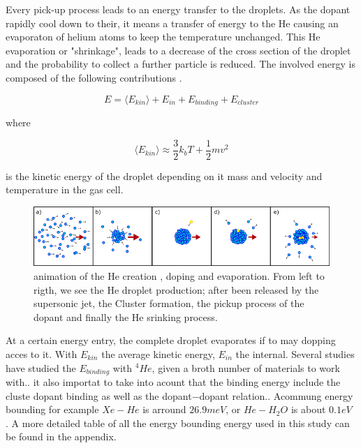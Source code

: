 Every pick-up process leads to an energy transfer to the droplets. As the dopant rapidly cool down to their, it means a transfer of energy to the He causing an  evaporaton of  helium atoms to keep the temperature unchanged. This He evaporation or "shrinkage", leads to a decrease of the cross section of the droplet and the probability to collect a further particle is  reduced. The involved energy is composed of the following contributions \cite{bunermann_modeling_2011}.

\begin{equation}
E=\langle E_{kin}\rangle + E_{in} + E_{binding} + E_{cluster}
\end{equation}

where

\begin{equation}
\langle E_{kin}\rangle \approx \dfrac{3}{2}k_{b}T + \dfrac{1}{2} m v^{2}
\end{equation}

is the kinetic energy of the droplet depending on it mass and velocity and temperature in the gas cell.


\begin{figure}[hbtp]

\centering
\includegraphics[width=14cm]{../Images/He_evaporation (2).png}
\caption{animation of the He creation , doping and evaporation. From left to rigth, we see the He droplet production; after been released by the supersonic jet, the Cluster formation, the pickup process of the dopant and finally the He srinking process.}
\label{fig:shrink}
\end{figure}

At a certain energy entry, the complete droplet evaporates if to may dopping acces to it. With $E_{kin}$ the average kinetic energy, $E_{in}$ the internal. Several studies have studied the $E_{binding}$ with $^{4}He$, given a broth number of materials to work with.. it also importat to take into acount that the binding energy include the cluste dopant binding as well as the dopant$-$dopant relation.\cite{toennies_spectroscopy_1998}. Acommung energy bounding for example $Xe-He$ is arround $26.9 meV$\cite{lewerenz_successive_1995}, or $He-H_{2}O$ is about $0.1 eV$ \cite{lewis_helium_2014}. A more detailed table of all the energy bounding energy used in this study can be found in the appendix.



